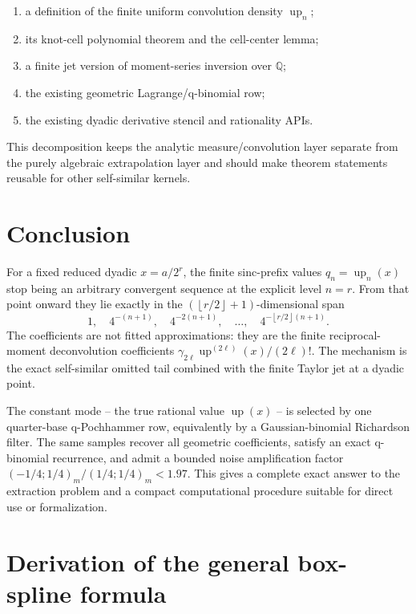 \documentclass[11pt,a4paper]{article}
\theoremstyle{remark}
\newcommand{\Q}{\mathbb{Q}}
\newcommand{\up}{\operatorname{up}}
\newcommand{\floor}[1]{\left\lfloor #1\right\rfloor}
\begin{document}
\begin{enumerate}
\item a definition of the finite uniform convolution density $\up_n$;
\item its knot-cell polynomial theorem and the cell-center lemma;
\item a finite jet version of moment-series inversion over $\Q$;
\item the existing geometric Lagrange/q-binomial row;
\item the existing dyadic derivative stencil and rationality APIs.
\end{enumerate}

This decomposition keeps the analytic measure/convolution layer separate from
the purely algebraic extrapolation layer and should make theorem statements
reusable for other self-similar kernels.

\section{Conclusion}

For a fixed reduced dyadic $x=a/2^r$, the finite sinc-prefix values
$q_n=\up_n(x)$ stop being an arbitrary convergent sequence at the explicit
level $n=r$.  From that point onward they lie exactly in the
$(\floor{r/2}+1)$-dimensional span
\[
 1,\quad 4^{-(n+1)},\quad 4^{-2(n+1)},\quad\ldots,\quad
 4^{-\floor{r/2}(n+1)}.
\]
The coefficients are not fitted approximations: they are the finite
reciprocal-moment deconvolution coefficients
$\gamma_{2\ell}\up^{(2\ell)}(x)/(2\ell)!$.  The mechanism is the exact
self-similar omitted tail combined with the finite Taylor jet at a dyadic
point.

The constant mode -- the true rational value $\up(x)$ -- is selected by one
quarter-base q-Pochhammer row, equivalently by a Gaussian-binomial Richardson
filter.  The same samples recover all geometric coefficients, satisfy an
exact q-binomial recurrence, and admit a bounded noise amplification factor
$(-1/4;1/4)_m/(1/4;1/4)_m<1.97$.  This gives a complete exact answer to the
extraction problem and a compact computational procedure suitable for direct
use or formalization.

\appendix

\section{Derivation of the general box-spline formula}
\label{app:box-spline}
\end{document}
